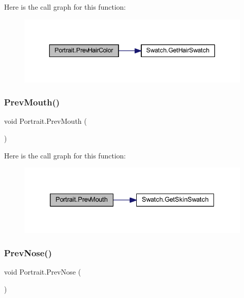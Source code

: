 Here is the call graph for this function\+:\nopagebreak
\begin{figure}[H]
\begin{center}
\leavevmode
\includegraphics[width=343pt]{class_portrait_a29b9670f2b653ffe43cf81e94e90062a_cgraph}
\end{center}
\end{figure}
\mbox{\label{class_portrait_ac81c66115ce3df6a35af825e43742211}} 
\subsubsection{\texorpdfstring{PrevMouth()}{PrevMouth()}}
{\footnotesize\ttfamily void Portrait.\+Prev\+Mouth (\begin{DoxyParamCaption}{ }\end{DoxyParamCaption})}

Here is the call graph for this function\+:\nopagebreak
\begin{figure}[H]
\begin{center}
\leavevmode
\includegraphics[width=332pt]{class_portrait_ac81c66115ce3df6a35af825e43742211_cgraph}
\end{center}
\end{figure}
\mbox{\label{class_portrait_afc5cd84e6086e462adb30f0d988c76b6}} 
\subsubsection{\texorpdfstring{PrevNose()}{PrevNose()}}
{\footnotesize\ttfamily void Portrait.\+Prev\+Nose (\begin{DoxyParamCaption}{ }\end{DoxyParamCaption})}

